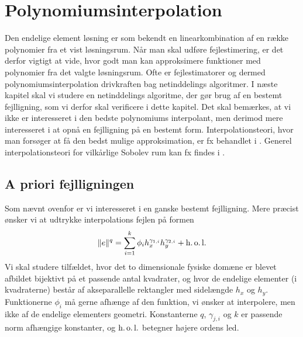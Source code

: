 \chapter{Polynomiumsinterpolation} \label{interpolation}

Den endelige element løsning er som bekendt en linearkombination af en
række polynomier fra et vist løsningsrum. Når man skal udføre
fejlestimering, er det derfor vigtigt at vide, hvor godt man kan
approksimere funktioner med polynomier fra det valgte løsningsrum. Ofte er
fejlestimatorer og dermed polynomiumsinterpolation drivkraften bag
netinddelings algoritmer. I næste kapitel skal vi studere en
netinddelings algoritme, der gør brug af en bestemt fejlligning, som
vi derfor skal verificere i dette kapitel. Det skal bemærkes, at vi
ikke er interesseret i den bedste polynomiums interpolant, men derimod
mere interesseret i at opnå en fejlligning på en bestemt form.
Interpolationsteori, hvor man forsøger at få den bedst mulige
approksimation, er fx behandlet i \cite{chen1,chen2}. Generel
interpolationsteori for vilkårlige Sobolev rum kan fx findes i
\cite{ciarlet78}.

\section{A priori fejlligningen}
Som nævnt ovenfor er vi interesseret i en ganske bestemt fejlligning.
Mere præcist ønsker vi at udtrykke interpolations fejlen på formen
\begin{equation}
  \|e\|^q = \sum_{i=1}^k \phi_i h_x^{\gamma_{1,i}}
  h_y^{\gamma_{2,i}} + \operatorname{h.o.l.}
\end{equation}
Vi skal studere tilfældet, hvor det to dimensionale fysiske domæne er
blevet afbildet bijektivt på et passende antal kvadrater, og hvor de
endelige elementer (i kvadraterne) består af akseparallelle rektangler
med sidelængde $h_x$ og $h_y$. Funktionerne $\phi_i$ må gerne afhænge
af den funktion, vi ønsker at interpolere, men ikke af de endelige
elementers geometri. Konstanterne $q$, $\gamma_{j,i}$ og $k$ er
passende norm afhængige konstanter, og $\operatorname{h.o.l.}$ betegner højere ordens
led.

